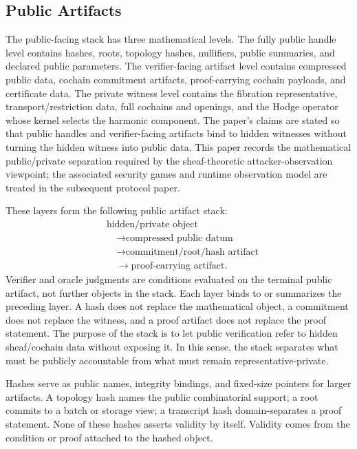 \subsection{Public Artifacts}

The public-facing stack has three mathematical levels. The fully public handle
level contains hashes, roots, topology hashes, nullifiers, public summaries, and
declared public parameters. The verifier-facing artifact level contains
compressed public data, cochain commitment artifacts, proof-carrying cochain
payloads, and certificate data. The private witness level contains the fibration
representative, transport/restriction data, full cochains and openings, and the
Hodge operator whose kernel selects the harmonic component. The paper's claims
are stated so that public handles and verifier-facing artifacts bind to hidden
witnesses without turning the hidden witness into public data. This paper
records the mathematical public/private separation required by the
sheaf-theoretic attacker-observation viewpoint; the associated security games
and runtime observation model are treated in the subsequent protocol paper.

These layers form the following public artifact stack:
\[
\begin{aligned}
  &\text{hidden/private object} \\
  &\quad\to \text{compressed public datum} \\
  &\quad\to \text{commitment/root/hash artifact} \\
  &\quad\to \text{proof-carrying artifact}.
\end{aligned}
\]
Verifier and oracle judgments are conditions evaluated on the terminal
public artifact, not further objects in the stack.
Each layer binds to or summarizes the preceding layer. A hash does not replace
the mathematical object, a commitment does not replace the witness, and a proof
artifact does not replace the proof statement. The purpose of the stack is to
let public verification refer to hidden sheaf/cochain data without exposing it.
In this sense, the stack separates what must be publicly accountable from what
must remain representative-private.

Hashes serve as public names, integrity bindings, and fixed-size pointers for
larger artifacts. A topology hash names the public combinatorial support; a
root commits to a batch or storage view; a transcript hash domain-separates a
proof statement. None of these hashes asserts validity by itself. Validity
comes from the condition or proof attached to the hashed object.

